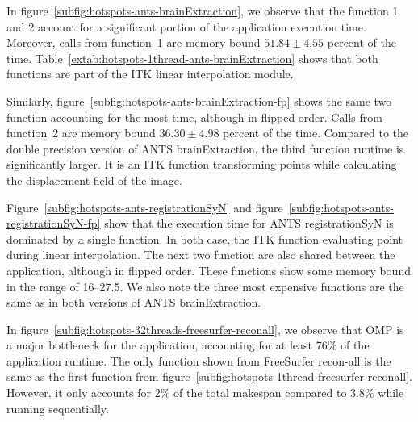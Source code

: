 \documentclass[conference]{IEEEtran}
\begin{document}
In figure~\ref{subfig:hotspots-ants-brainExtraction}, we observe that the function 1 and 2 account for a significant portion of the application execution time. Moreover, calls from function~1 are memory bound $51.84\pm{4.55}$ percent of the time. Table~\ref{extab:hotspots-1thread-ants-brainExtraction} shows that both functions are part of the ITK linear interpolation module.

Similarly, figure~\ref{subfig:hotspots-ants-brainExtraction-fp} shows the same two function accounting for the most time, although in flipped order. Calls from function~2 are memory bound $36.30\pm{4.98}$ percent of the time. Compared to the double precision version of ANTS brainExtraction, the third function runtime is significantly larger. It is an ITK function transforming points while calculating the displacement field of the image.

Figure~\ref{subfig:hotspots-ants-registrationSyN} and figure~\ref{subfig:hotspots-ants-registrationSyN-fp} show that the execution time for ANTS registrationSyN is dominated by a single function. In both case, the ITK function evaluating point during linear interpolation. The next two function are also shared between the application, although in flipped order. These functions show some memory bound in the range of 16--27.5. We also note the three most expensive functions are the same as in both versions of ANTS brainExtraction.


In figure~\ref{subfig:hotspots-32threads-freesurfer-reconall}, we observe that OMP is a major bottleneck for the application, accounting for at least 76\% of the application runtime. The only function shown from FreeSurfer recon-all is the same as the first function from figure~\ref{subfig:hotspots-1thread-freesurfer-reconall}. However, it only accounts for 2\% of the total makespan compared to 3.8\% while running sequentially.
\end{document}
